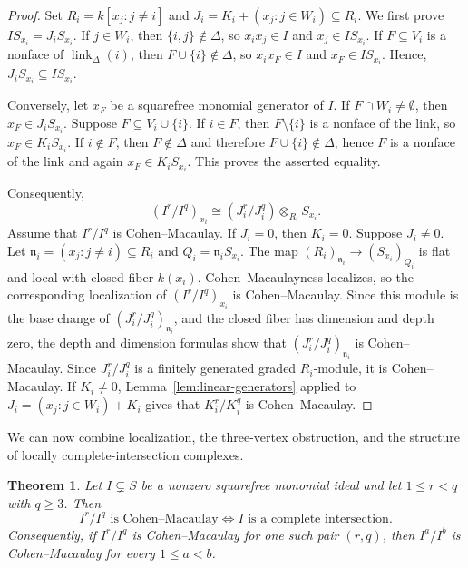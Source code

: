 \documentclass[12pt]{amsart}
\theoremstyle{plain}
\newtheorem{theorem}{Theorem}[section]
\theoremstyle{definition}
\theoremstyle{remark}
\begin{document}
\begin{proof}
Set $R_i=k[x_j:j\neq i]$ and
$J_i=K_i+(x_j:j\in W_i)\subseteq R_i$. We first prove
$IS_{x_i}=J_iS_{x_i}$. If $j\in W_i$, then $\{i,j\}\notin\Delta$, so
$x_ix_j\in I$ and $x_j\in IS_{x_i}$. If $F\subseteq V_i$ is a nonface of
$\operatorname{link}_\Delta(i)$, then $F\cup\{i\}\notin\Delta$, so
$x_ix_F\in I$ and $x_F\in IS_{x_i}$. Hence,
$J_iS_{x_i}\subseteq IS_{x_i}$.

Conversely, let $x_F$ be a squarefree monomial generator of $I$. If
$F\cap W_i\neq\emptyset$, then $x_F\in J_iS_{x_i}$. Suppose
$F\subseteq V_i\cup\{i\}$. If $i\in F$, then $F\setminus\{i\}$ is a
nonface of the link, so $x_F\in K_iS_{x_i}$. If $i\notin F$, then
$F\notin\Delta$ and therefore $F\cup\{i\}\notin\Delta$; hence $F$ is
a nonface of the link and again $x_F\in K_iS_{x_i}$. This proves the
asserted equality.

Consequently,
$$
(I^r/I^q)_{x_i}
\cong
(J_i^r/J_i^q)\otimes_{R_i}S_{x_i}.
$$
Assume that $I^r/I^q$ is Cohen--Macaulay. If $J_i=0$, then $K_i=0$. Suppose
$J_i\neq0$. Let $\mathfrak n_i=(x_j:j\neq i)\subseteq R_i$ and
$Q_i=\mathfrak n_iS_{x_i}$. The map
$(R_i)_{\mathfrak n_i}\to(S_{x_i})_{Q_i}$ is flat and local with closed
fiber $k(x_i)$. Cohen--Macaulayness localizes, so the corresponding localization of
$(I^r/I^q)_{x_i}$ is Cohen--Macaulay. Since this module is the base change of
$(J_i^r/J_i^q)_{\mathfrak n_i}$, and the closed fiber has dimension and
depth zero, the depth and dimension formulas show that
$(J_i^r/J_i^q)_{\mathfrak n_i}$ is Cohen--Macaulay. Since
$J_i^r/J_i^q$ is a finitely generated graded $R_i$-module, it is
Cohen--Macaulay. If $K_i\neq0$, Lemma~\ref{lem:linear-generators} applied to
$J_i=(x_j:j\in W_i)+K_i$ gives that $K_i^r/K_i^q$ is Cohen--Macaulay.
\end{proof}

We can now combine localization, the three-vertex obstruction, and the
structure of locally complete-intersection complexes.

\begin{theorem}\label{thm:ordinary}
Let $I\subsetneq S$ be a nonzero squarefree monomial ideal and let
$1\le r<q$ with $q\ge3$. Then
$$
I^r/I^q\text{ is Cohen--Macaulay}
\Longleftrightarrow
I\text{ is a complete intersection}.
$$
Consequently, if $I^r/I^q$ is Cohen--Macaulay for one such pair $(r,q)$,
then $I^a/I^b$ is Cohen--Macaulay for every $1\le a<b$.
\end{theorem}
\end{document}
